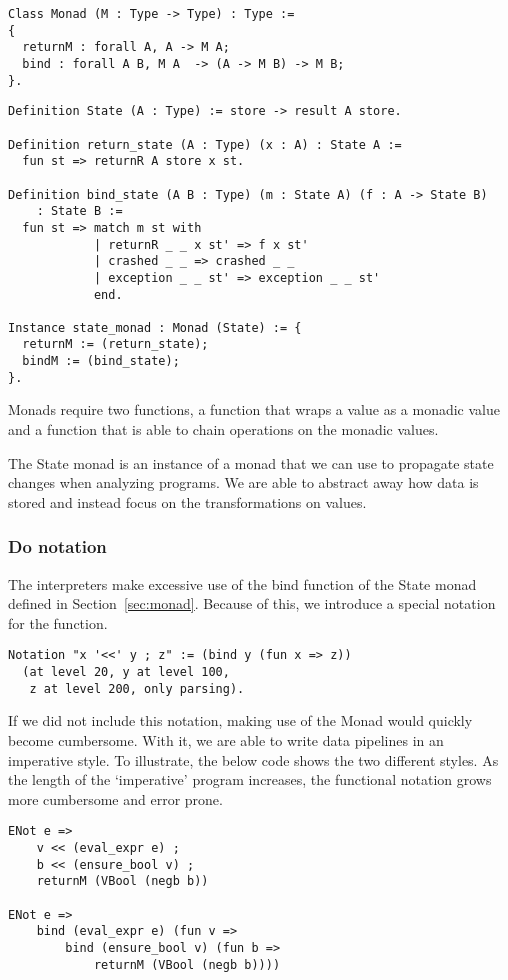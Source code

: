 \begin{verbatim}
Class Monad (M : Type -> Type) : Type :=
{
  returnM : forall A, A -> M A;
  bind : forall A B, M A  -> (A -> M B) -> M B;
}.
\end{verbatim}

\begin{verbatim}
Definition State (A : Type) := store -> result A store.

Definition return_state (A : Type) (x : A) : State A :=
  fun st => returnR A store x st.

Definition bind_state (A B : Type) (m : State A) (f : A -> State B) 
    : State B :=
  fun st => match m st with
            | returnR _ _ x st' => f x st'
            | crashed _ _ => crashed _ _
            | exception _ _ st' => exception _ _ st'
            end.

Instance state_monad : Monad (State) := {
  returnM := (return_state);
  bindM := (bind_state);
}.
\end{verbatim}

Monads require two functions, a  function that wraps a value as a
monadic value and a  function that is able to chain operations on the
monadic values. 

The State monad is an instance of a monad that we can use to propagate state
changes when analyzing programs. We are able to abstract away how data is
stored and instead focus on the transformations on values.

\subsubsection{Do notation}
The interpreters make excessive use of the bind function of the State monad
defined in Section~\ref{sec:monad}. Because of this, we introduce a special
notation for the function.

\begin{verbatim}
Notation "x '<<' y ; z" := (bind y (fun x => z))
  (at level 20, y at level 100, 
   z at level 200, only parsing).
\end{verbatim}

If we did not include this notation, making use of the Monad would quickly
become cumbersome. With it, we are able to write data pipelines in an
imperative style. To illustrate, the below code shows the two
different styles. As the length of the `imperative' program increases, the
functional notation grows more cumbersome and error prone.

\begin{verbatim}
ENot e =>
	v << (eval_expr e) ;
	b << (ensure_bool v) ;
	returnM (VBool (negb b))

ENot e =>
	bind (eval_expr e) (fun v =>
		bind (ensure_bool v) (fun b =>
			returnM (VBool (negb b))))
\end{verbatim}


